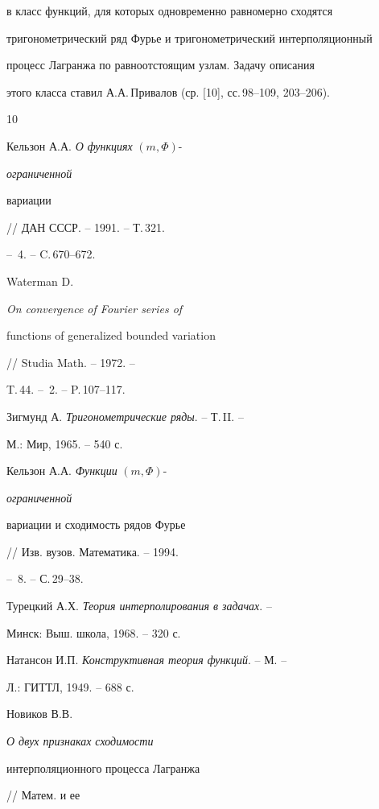 в класс функций, для которых одновременно равномерно сходятся


тригонометрический ряд Фурье и тригонометрический интерполяционный


процесс Лагранжа по равноотстоящим узлам. Задачу описания


этого класса ставил А.А.\,Привалов (ср. [10], сс.\,98--109, 203--206).





\begin{thebibliography}{10}







Кельзон А.А. {\it О функциях} $(m,\Phi)$-{\it ограниченной


вариации} // ДАН СССР. -- 1991. -- Т.\,321.


-- \No\,4. -- C.\,670--672.




Waterman D. {\it On convergence of Fourier series of


functions of generalized bounded variation} // Studia Math. -- 1972. --


T.\,44. -- \No\,2. -- P.\,107--117.




Зигмунд А. {\it Тригонометрические ряды}. -- Т.\,II. -- 


М.: Мир, 1965. -- 540 с.




Кельзон А.А. {\it Функции} $(m,\Phi)$-{\it ограниченной


вариации и сходимость рядов Фурье} // Изв. вузов. Математика. -- 1994.


-- \No\,8. -- С.\,29--38.




Турецкий А.Х. {\it Теория интерполирования в задачах}. --


Минск: Выш. школа, 1968. -- 320 с.




Натансон И.П. {\it Конструктивная теория функций}. -- М. --


Л.: ГИТТЛ, 1949. -- 688 с.




Новиков В.В. {\it О двух признаках сходимости 


интерполяционного процесса Лагранжа} // Матем. и ее



\end{thebibliography}
